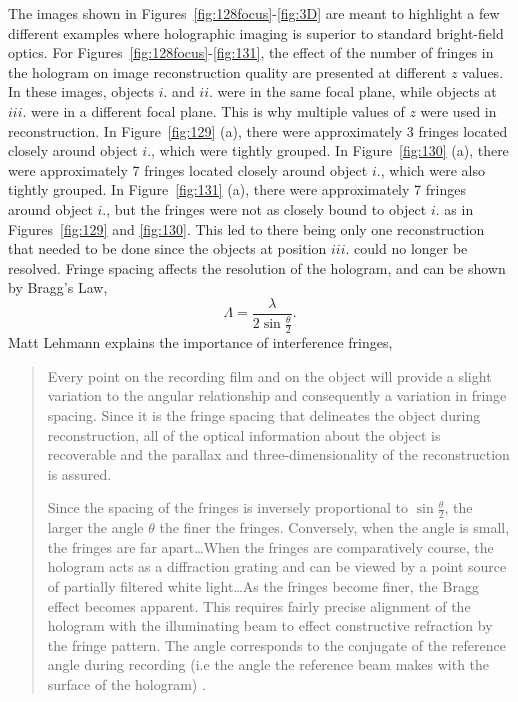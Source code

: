 The images shown in Figures~\ref{fig:128focus}-\ref{fig:3D} are meant to highlight a few different
examples where holographic imaging is superior to standard bright-field optics.
For Figures~\ref{fig:128focus}-\ref{fig:131}, the effect of the number of fringes in the hologram
on image reconstruction quality are presented at different $z$ values. 
In these images,
objects $i.$ and $ii.$ were in the same focal plane, while objects at $iii.$
were in
a different focal plane. This is why multiple values of $z$ were used in
reconstruction. In Figure~\ref{fig:129} (a), there were approximately 3 fringes
located closely around object $i.$, which were tightly grouped. In
Figure~\ref{fig:130} (a), there were approximately 7 fringes
located closely around object $i.$, which were also tightly grouped. In
Figure~\ref{fig:131} (a), there were approximately 7 fringes around object
$i.$, but the fringes were not as closely bound to object $i.$ as in
Figures~\ref{fig:129} and \ref{fig:130}. This led to there being only one
reconstruction that needed to be done since the objects at position $iii.$
could no longer be resolved. Fringe spacing affects the resolution of the
hologram, and can be shown by Bragg's Law,
\begin{equation}
    \Lambda = \frac{\lambda}{2\sin{\frac{\theta}{2}}} .
\end{equation}
Matt Lehmann explains the importance of interference fringes,
\begin{quote}
Every point on the recording film and on the object will provide a
slight variation to the angular relationship and consequently a variation
in fringe spacing. Since it is the fringe spacing that delineates
the object
during reconstruction, all of the optical information about the object is
recoverable and the parallax and three-dimensionality of the
reconstruction is assured.

Since the spacing of the fringes is inversely proportional to
$\sin{\frac{\theta}{2}}$, the larger the angle $\theta$ the finer the fringes.
Conversely, when the angle is small, the fringes are far apart\ldots When the
fringes are comparatively course, the hologram acts as a diffraction grating
and can be viewed by a point source of partially filtered white light\ldots As
the fringes become finer, the Bragg effect becomes apparent. This requires
fairly precise alignment of the hologram with the illuminating beam to effect
constructive refraction by the fringe pattern. The angle corresponds to the
conjugate of the reference angle during recording (i.e the angle the reference
beam makes with the surface of the hologram) \cite{Lehmann}.
\end{quote}
